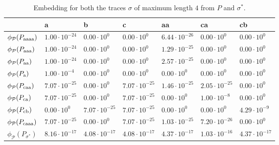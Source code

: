 \begin{table}[!t]
	\centering
	\caption{Embedding for both the traces $\sigma$ of maximum length $4$ from $P$ and  $\sigma^*$.}\label{tab:emb2}\label{tab:embsitar}
	\begin{tabular}{l|l|l|l|l|l|l|}
		\toprule
		& a    & b                                                   & c    & aa   & ca   & cb   \\
		\midrule
		
		
		$\phi_{\mathcal{P}}(P_\textup{aaaa})$ & $1.00\cdot 10^{-24}$ & $0.00\cdot 10^{0}$ & $0.00\cdot 10^{0}$& $6.44\cdot 10^{-26}$& $0.00\cdot 10^{0}$& $0.00\cdot 10^{0}$\\
		$\phi_{\mathcal{P}}(P_\textup{aaa})$ & $1.00\cdot 10^{-24}$ & $0.00\cdot 10^{0}$ & $0.00\cdot 10^{0}$& $1.29\cdot 10^{-25}$& $0.00\cdot 10^{0}$& $0.00\cdot 10^{0}$\\
		$\phi_{\mathcal{P}}(P_\textup{aa})$ & $1.00\cdot 10^{-24}$ & $0.00\cdot 10^{0}$ & $0.00\cdot 10^{0}$& $2.57\cdot 10^{-25}$& $0.00\cdot 10^{0}$& $0.00\cdot 10^{0}$\\
		$\phi_{\mathcal{P}}(P_\textup{a})$ & $1.00\cdot 10^{-4}$ & $0.00\cdot 10^{0}$ & $0.00\cdot 10^{0}$& $0.00\cdot 10^{0}$& $0.00\cdot 10^{0}$& $0.00\cdot 10^{0}$\\
		$\phi_{\mathcal{P}}(P_\textup{caa})$ & $7.07\cdot 10^{-25}$ & $0.00\cdot 10^{0}$ & $7.07\cdot 10^{-25}$& $1.46\cdot 10^{-25}$& $2.05\cdot 10^{-25}$& $0.00\cdot 10^{0}$\\
		$\phi_{\mathcal{P}}(P_\textup{ca})$ & $7.07\cdot 10^{-25}$ & $0.00\cdot 10^{0}$ & $7.07\cdot 10^{-25}$& $0.00\cdot 10^{0}$& $1.00\cdot 10^{-8}$& $0.00\cdot 10^{0}$\\
		$\phi_{\mathcal{P}}(P_\textup{cb})$ &  $0.00\cdot 10^{0}$ & $7.07\cdot 10^{-25}$ & $7.07\cdot 10^{-25}$& $0.00\cdot 10^{0}$&  $0.00\cdot 10^{0}$ & $4.29\cdot 10^{-9}$\\
		$\phi_{\mathcal{P}}(P_\textup{caaa})$  & $7.07\cdot 10^{-25}$ &  $0.00\cdot 10^{0}$ & $7.07\cdot 10^{-25}$& $1.03\cdot 10^{-25}$&  $7.20\cdot 10^{-26}$ & $0.00\cdot 10^{0}$\\
		\bottomrule
				$\phi_{\mathcal{P}}(P_{\sigma^*})$ & $8.16\cdot10^{-17}$ & $4.08\cdot 10^{-17}$ & $4.08\cdot10^{-17}$ & $4.37\cdot 10^{-17}$ & $1.03\cdot10^{-16}$ & $4.37\cdot10^{-17}$\\
		\bottomrule
	\end{tabular}
\end{table}  
